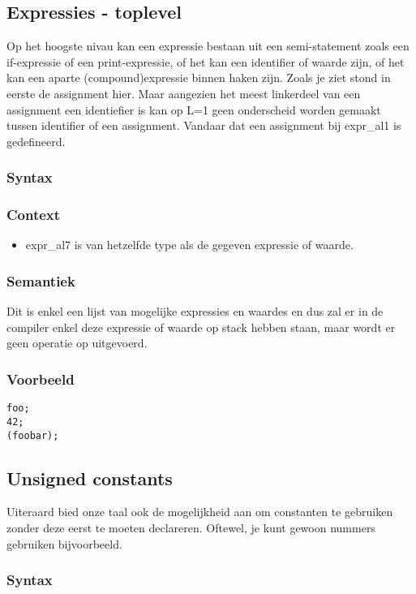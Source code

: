\documentclass[]{article}
\begin{document}
\subsection{Expressies - toplevel}
Op het hoogste nivau kan een expressie bestaan uit een semi-statement zoals een if-expressie of een print-expressie, of het kan een identifier of waarde zijn, of het kan een aparte (compound)expressie binnen haken zijn.
Zoals je ziet stond in eerste de assignment hier. Maar aangezien het meest linkerdeel van een assignment een identiefier is kan op L=1 geen onderscheid worden gemaakt tussen identifier of een assignment. Vandaar dat een assignment bij expr\_al1 is gedefineerd.
\subsubsection{Syntax}

\subsubsection{Context}
\begin{itemize}
\item expr\_al7 is van hetzelfde type als de gegeven expressie of waarde.
\end{itemize}
\subsubsection{Semantiek}
Dit is enkel een lijst van mogelijke expressies en waardes en dus zal er in de compiler enkel deze expressie of waarde op stack hebben staan, maar wordt er geen operatie op uitgevoerd.
\subsubsection{Voorbeeld}
\begin{lstlisting}[style=SELMA]
foo;
42;
(foobar);
\end{lstlisting}

\subsection{Unsigned constants}
Uiteraard bied onze taal ook de mogelijkheid aan om constanten te gebruiken zonder deze eerst te moeten declareren. Oftewel, je kunt gewoon nummers gebruiken bijvoorbeeld.
\subsubsection{Syntax}

\end{document}
